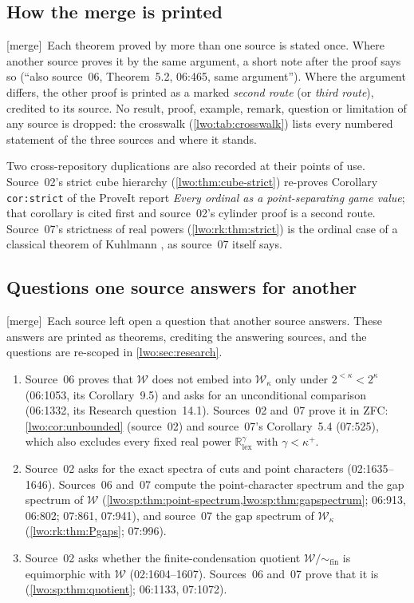 \documentclass[11pt,a4paper]{article}
\theoremstyle{definition}
\theoremstyle{remark}
\newcommand{\R}{\mathbb R}
\newcommand{\W}{\mathcal W}
\newcommand{\lex}{\mathrm{lex}}
\newcommand{\Wq}{\W/{\sim_{\mathrm{fin}}}}
\newcommand{\merge}{\textsf{[merge]}}
\begin{document}
\subsection{How the merge is printed}\label{lwo:sec:how}
\merge\ Each theorem proved by more than one source is stated once. Where
another source proves it by the same argument, a short note after the proof
says so (``also source~06, Theorem~5.2, 06:465, same argument''). Where the
argument differs, the other proof is printed as a marked \emph{second route}
(or \emph{third route}), credited to its source. No result, proof, example,
remark, question or limitation of any source is dropped: the crosswalk
(\cref{lwo:tab:crosswalk}) lists every numbered statement of the three
sources and where it stands.

Two cross-repository duplications are also recorded at their points of use.
Source~02's strict cube hierarchy (\cref{lwo:thm:cube-strict}) re-proves
Corollary \texttt{cor:strict} of the ProveIt report \emph{Every ordinal as a
point-separating game value}; that corollary is cited first and source~02's
cylinder proof is a second route. Source~07's strictness of real powers
(\cref{lwo:rk:thm:strict}) is the ordinal case of a classical theorem of
Kuhlmann \cite[Corollary~2.4]{Kuhlmann}, as source~07 itself says.

\subsection{Questions one source answers for another}\label{lwo:sec:answered}
\merge\ Each source left open a question that another source answers. These
answers are printed as theorems, crediting the answering sources, and the
questions are re-scoped in \cref{lwo:sec:research}.
\begin{enumerate}[label=(\roman*)]
\item Source~06 proves that $\W$ does not embed into $\W_\kappa$ only under
$2^{<\kappa}<2^\kappa$ (06:1053, its Corollary~9.5) and asks for an
unconditional comparison (06:1332, its Research question~14.1). Sources~02
and~07 prove it in ZFC: \cref{lwo:cor:unbounded} (source~02) and source~07's
Corollary~5.4 (07:525), which also excludes every fixed real power
$\R^\gamma_{\lex}$ with $\gamma<\kappa^+$.
\item Source~02 asks for the exact spectra of cuts and point characters
(02:1635--1646). Sources~06 and~07 compute the point-character spectrum and
the gap spectrum of $\W$ (\cref{lwo:sp:thm:point-spectrum,lwo:sp:thm:gapspectrum};
06:913, 06:802; 07:861, 07:941), and source~07 the gap spectrum of $\W_\kappa$
(\cref{lwo:rk:thm:Pgaps}; 07:996).
\item Source~02 asks whether the finite-condensation quotient $\Wq$ is
equimorphic with $\W$ (02:1604--1607). Sources~06 and~07 prove that it is
(\cref{lwo:sp:thm:quotient}; 06:1133, 07:1072).
\end{enumerate}
\end{document}
